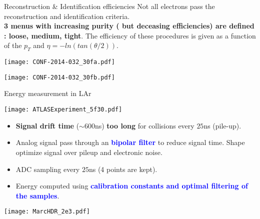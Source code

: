 \begin{frame}{Reconstruction \& Identification efficiencies}
  Not all electrons pass the reconstruction and identification criteria. \\
  {\bf 3 menus with increasing purity ( but deceasing efficiencies) are defined : loose, medium, tight}.
  The efficiency of these procedures is given as a function of the $p_T$ and $\eta=-ln(tan(\theta/2))$.\\
\begin{minipage}{0.49\linewidth}
  \texttt{[image: CONF-2014-032\_30fa.pdf]}
\end{minipage}
\begin{minipage}{0.49\linewidth}
  \texttt{[image: CONF-2014-032\_30fb.pdf]}
\end{minipage}
\end{frame}
\begin{frame}{Energy measurement in LAr}
\begin{minipage}{0.3\linewidth}
    \texttt{[image: ATLASExperiment\_5f30.pdf]}
\end{minipage}
\hfill
\begin{minipage}{0.69\linewidth}
\begin{itemize}
\item {\bf Signal drift time }($\sim 600$ns) {\bf too long} for collisions every $25$ns (pile-up).
\item Analog signal pass through an \textcolor{blue}{\bf bipolar filter } to reduce signal time.
Shape optimize signal over pileup and electronic noise.
\item ADC sampling every $25$ns (4 points are kept).
\item Energy computed using \textcolor{blue}{\bf calibration constants and optimal filtering of the samples}.
\end{itemize}
\end{minipage}
\begin{center}
    \texttt{[image: MarcHDR\_2e3.pdf]}
\end{center}

\end{frame}
